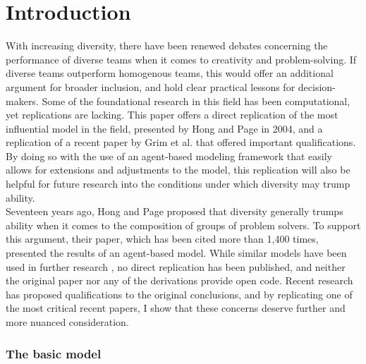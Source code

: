 
\section{Introduction}

With increasing diversity, there have been renewed debates concerning the performance of diverse teams when it comes to creativity and problem-solving. If diverse teams outperform homogenous teams, this would offer an additional argument for broader inclusion, and hold clear practical lessons for decision-makers. Some of the foundational research in this field has been computational, yet replications are lacking. This paper offers a direct replication of the most influential model in the field, presented by Hong and Page in 2004\supercite{hong_groups_2004}, and a replication of a recent paper by Grim et al.\supercite{grim_diversity_2019} that offered important qualifications. By doing so with the use of an agent-based modeling framework that easily allows for extensions and adjustments to the model, this replication will also be helpful for future research into the conditions under which diversity may trump ability. \\

Seventeen years ago, Hong and Page\supercite{hong_groups_2004} proposed that diversity generally trumps ability when it comes to the composition of groups of problem solvers. To support this argument, their paper, which has been cited more than 1,400 times, presented the results of an agent-based model. While similar models have been used in further research \supercite{singer2019diversity, grim_diversity_2019, holman2018diversity}, no direct replication has been published, and neither the original paper nor any of the derivations provide open code. Recent research has proposed qualifications to the original conclusions, and by replicating one of the most critical recent papers\supercite{grim_diversity_2019}, I show that these concerns deserve further and more nuanced consideration.  

\subsubsection{The basic model}

